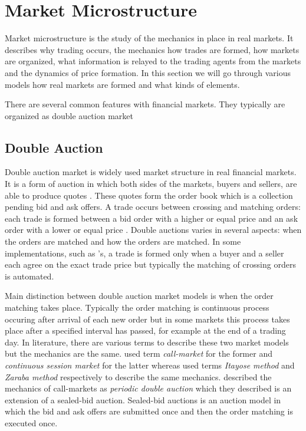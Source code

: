 \section{Market Microstructure}

Market microstructure is the study of the mechanics in place in real markets.
It describes why trading occurs, the mechanics how trades are formed, 
how markets are organized, what information is relayed to the trading 
agents from the markets and the dynamics of price formation. \citep[p. 3-6]{Has07}
In this section we will go through various models how real markets 
are formed and what kinds of elements.

There are several common features with financial markets. They typically are
organized as double auction market 

\subsection{Double Auction}

Double auction market is widely used market structure in real 
financial markets. It is a form of auction 
in which both sides of the markets, buyers and sellers, are able to 
produce quotes \citep*{Kle99}. These quotes form the order book 
which is a collection pending bid and ask offers. A trade 
occurs between crossing and matching orders: each trade is formed between 
a bid order with a higher or equal price and an ask order with a lower 
or equal price \citep*{Ben12}. Double auctions varies in
several aspects: when the orders are matched and how the orders are matched. 
In some implementations, such as \citet*{God93}'s, a trade is 
formed only when a buyer and a seller each agree on the exact trade 
price but typically the matching of crossing orders is automated.


Main distinction between double auction market models is when
the order matching takes place. Typically the order matching 
is continuous process occuring after arrival of each new order but
in some markets this process takes place after a specified interval
has passed, for example at the end of a trading day. \citep{boer05}
In literature, there are various terms to describe these two market models
but the mechanics are the same. \citet{boer05} used term 
\textit{call-market} for the former and \textit{continuous session market}
for the latter whereas \citet{ASt05} used terms \textit{Itayose method}
and \textit{Zaraba method} respectively to describe the same mechanics. \citet{Moc15} described
the mechanics of call-markets as \textit{periodic double auction} which
they described is an extension of a sealed-bid auction. Sealed-bid auctions
is an auction model in which the bid and ask offers
are submitted once and then the order matching is executed once. 

